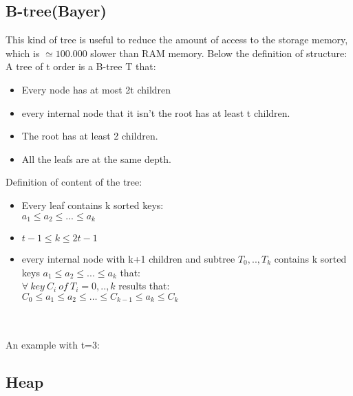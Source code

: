 \documentclass{article}
\begin{document}
\subsection{B-tree(Bayer)}
This kind of tree is useful to reduce the amount of access to the storage memory, which is $\simeq 100.000$ slower than RAM memory. Below the definition of structure:\\
A tree of t order is a B-tree T that:
\begin{itemize}
\item Every node has at most 2t children
\item every internal node that it isn't the root has at least t children.
\item The root has at least 2 children.
\item All the leafs are at the same depth.
\end{itemize}
\begin{large}
Definition of content of the tree:\\
\begin{itemize}
\item Every leaf contains k sorted keys: \\
$a_1 \leq a_2 \leq ... \leq a_k$
\item $t-1 \leq k \leq 2t-1$
\item every internal node with k+1 children and subtree $T_0,..,T_k$ contains k sorted keys $a_1 \leq a_2 \leq ... \leq a_k$ that:\\
$\forall \ key \ C_i \ of \ T_i=0,..,k $ results that:\\
$C_0 \leq a_1 \leq a_2 \leq \ldots \leq C_{k-1} \leq a_k \leq C_k$
\end{itemize}
\end{large} \leavevmode \\ \\
An example with t=3:\\
\subsection{Heap}
\end{document}
